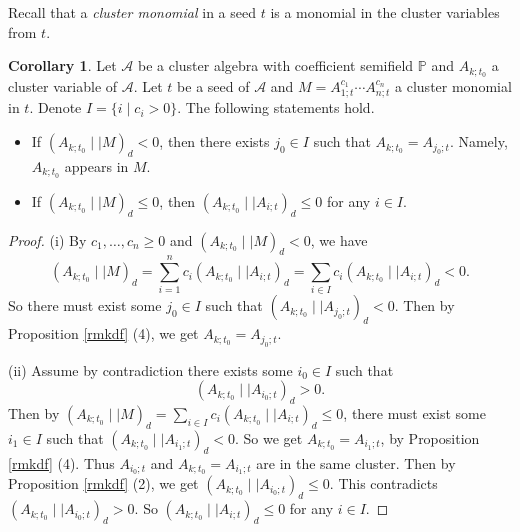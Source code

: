 \documentclass{amsart}
\theoremstyle{definition}
\newtheorem{corollary}[theorem]{Corollary}
\theoremstyle{remark}
\numberwithin{equation}{section}
\begin{document}
Recall that a {\em cluster monomial} in a seed $t$  is a monomial in the cluster variables from $t$.
\begin{corollary}\label{cordmonomial}
Let $\mathcal A$ be a cluster algebra with coefficient semifield $\mathbb P$ and $A_{k;t_0}$ a cluster variable of $\mathcal A$. Let $t$ be a seed of $\mathcal A$ and $M=A_{1;t}^{c_1}\cdots A_{n;t}^{c_n}$ a cluster monomial in $t$. Denote $I=\{i\mid c_i>0\}$. The following statements hold.
\begin{itemize}
\item[(i)]If $(A_{k;t_0}\mid\mid  M)_d<0$, then there exists $j_0\in I$ such that $A_{k;t_0}=A_{j_0;t}$. Namely, $A_{k;t_0}$ appears in $M$.

\item[(ii)] If $(A_{k;t_0}\mid\mid  M)_d\leq0$, then $(A_{k;t_0}\mid\mid  A_{i;t})_d\leq0$ for any $i\in I$.
\end{itemize}
\end{corollary}
\begin{proof}
(i) By $c_1,\ldots,c_n\geq0$ and $(A_{k;t_0}\mid\mid  M)_d<0$, we have
$$(A_{k;t_0}\mid\mid  M)_d=\sum_{i=1}^nc_i(A_{k;t_0}\mid\mid  A_{i;t})_d=\sum_{i\in I}c_i(A_{k;t_0}\mid\mid  A_{i;t})_d<0.$$
So there must exist some $j_0\in I$ such that $(A_{k;t_0}\mid\mid  A_{j_0;t})_d<0$. Then by Proposition \ref{rmkdf} (4), we get $A_{k;t_0}=A_{j_0;t}$.



(ii) Assume by contradiction there exists some $i_0\in I$ such that
$$(A_{k;t_0}\mid\mid  A_{i_0;t})_d>0.$$ Then by $(A_{k;t_0}\mid\mid  M)_d=\sum\limits_{i\in I}c_i(A_{k;t_0}\mid\mid  A_{i;t})_d\leq0$, there must exist some $i_1\in I$ such that $(A_{k;t_0}\mid\mid  A_{i_1;t})_d<0$. So we get $A_{k;t_0}=A_{i_1;t}$, by Proposition \ref{rmkdf} (4). Thus $A_{i_0;t}$ and $A_{k;t_0}=A_{i_1;t}$ are in the same cluster. Then by  Proposition \ref{rmkdf} (2), we get $(A_{k;t_0}\mid\mid  A_{i_0;t})_d\leq 0$. This contradicts  $(A_{k;t_0}\mid\mid  A_{i_0;t})_d>0$. So $(A_{k;t_0}\mid\mid  A_{i;t})_d\leq0$ for any $i\in I$.
\end{proof}
\end{document}
